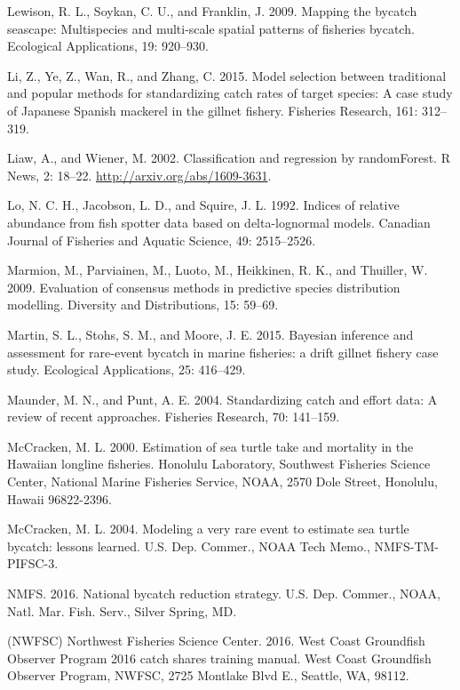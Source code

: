 \documentclass[]{article}
\begin{document}
\hypertarget{ref-lewison2009}{}
Lewison, R. L., Soykan, C. U., and Franklin, J. 2009. Mapping the
bycatch seascape: Multispecies and multi-scale spatial patterns of
fisheries bycatch. Ecological Applications, 19: 920--930.

\hypertarget{ref-li2015}{}
Li, Z., Ye, Z., Wan, R., and Zhang, C. 2015. Model selection between
traditional and popular methods for standardizing catch rates of target
species: A case study of Japanese Spanish mackerel in the gillnet
fishery. Fisheries Research, 161: 312--319.

\hypertarget{ref-liaw2002}{}
Liaw, A., and Wiener, M. 2002. Classification and regression by
randomForest. R News, 2: 18--22. \url{http://arxiv.org/abs/1609-3631}.

\hypertarget{ref-lo1992}{}
Lo, N. C. H., Jacobson, L. D., and Squire, J. L. 1992. Indices of
relative abundance from fish spotter data based on delta-lognormal
models. Canadian Journal of Fisheries and Aquatic Science, 49:
2515--2526.

\hypertarget{ref-marmion2009}{}
Marmion, M., Parviainen, M., Luoto, M., Heikkinen, R. K., and Thuiller,
W. 2009. Evaluation of consensus methods in predictive species
distribution modelling. Diversity and Distributions, 15: 59--69.

\hypertarget{ref-martin2015}{}
Martin, S. L., Stohs, S. M., and Moore, J. E. 2015. Bayesian inference
and assessment for rare-event bycatch in marine fisheries: a drift
gillnet fishery case study. Ecological Applications, 25: 416--429.

\hypertarget{ref-maunder2004}{}
Maunder, M. N., and Punt, A. E. 2004. Standardizing catch and effort
data: A review of recent approaches. Fisheries Research, 70: 141--159.

\hypertarget{ref-mccracken2000}{}
McCracken, M. L. 2000. Estimation of sea turtle take and mortality in
the Hawaiian longline fisheries. Honolulu Laboratory, Southwest
Fisheries Science Center, National Marine Fisheries Service, NOAA, 2570
Dole Street, Honolulu, Hawaii 96822-2396.

\hypertarget{ref-mccracken2004}{}
McCracken, M. L. 2004. Modeling a very rare event to estimate sea turtle
bycatch: lessons learned. U.S. Dep. Commer., NOAA Tech Memo.,
NMFS-TM-PIFSC-3.

\hypertarget{ref-nmfs2016bycatch}{}
NMFS. 2016. National bycatch reduction strategy. U.S. Dep. Commer.,
NOAA, Natl. Mar. Fish. Serv., Silver Spring, MD.

\hypertarget{ref-nwfsc2016}{}
(NWFSC) Northwest Fisheries Science Center. 2016. West Coast Groundfish
Observer Program 2016 catch shares training manual. West Coast
Groundfish Observer Program, NWFSC, 2725 Montlake Blvd E., Seattle, WA,
98112.
\end{document}

